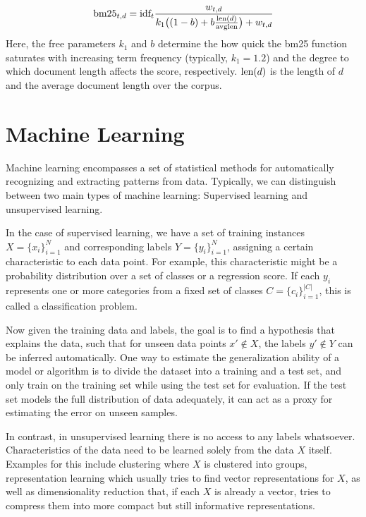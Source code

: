 \begin{equation}
    \text{bm25}_{t,d} = \text{idf}_t \frac{w_{t,d}}{k_1 \big((1 - b) + b \frac{\text{len}(d)}{\text{avglen}}\big) + w_{t,d}}
\end{equation}
Here, the free parameters $k_1$ and $b$ determine the how quick the bm25 function saturates with increasing term frequency (typically, $k_1=1.2$) and the degree to which document length affects the score, respectively. $\text{len}(d)$ is the length of $d$ and  the average document length over the corpus.

\section{Machine Learning}
\label{sec:ml}
Machine learning encompasses a set of statistical methods for automatically recognizing and extracting patterns from data. Typically, we can distinguish between two main types of machine learning: Supervised learning and unsupervised learning.

In the case of supervised learning, we have a set of training instances $X = \{x_i\}_{i=1}^N$ and corresponding labels $Y = \{y_i\}_{i=1}^N$, assigning a certain characteristic to each data point. For example, this characteristic might be a probability distribution over a set of classes or a regression score. If each $y_i$ represents one or more categories from a fixed set of classes $C = \{c_i\}_{i=1}^{|C|}$, this is called a classification problem.

Now given the training data and labels, the goal is to find a hypothesis that explains the data, such that for unseen data points $x' \notin X$, the labels $y' \notin Y$ can be inferred automatically. One way to estimate the generalization ability of a model or algorithm is to divide the dataset into a training and a test set, and only train on the training set while using the test set for evaluation. If the test set models the full distribution of data adequately, it can act as a proxy for estimating the error on unseen samples.

In contrast, in unsupervised learning there is no access to any labels whatsoever. Characteristics of the data need to be learned solely from the data $X$ itself. Examples for this include clustering where $X$ is clustered into groups, representation learning which usually tries to find vector representations for $X$, as well as dimensionality reduction that, if each $X$ is already a vector, tries to compress them into more compact but still informative representations.

